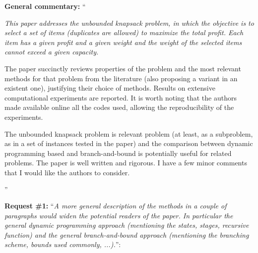 \documentclass{elsarticle}
\begin{document}
\textbf{General commentary:} ``{\itshape
This paper addresses the unbounded knapsack problem, in which the objective is to select a set of items (duplicates are allowed) to maximize the total profit. Each item has a given profit and a given weight and the weight of the selected items cannot exceed a given capacity.

The paper succinctly reviews properties of the problem and the most relevant methods for that problem from the literature (also proposing a variant in an existent one), justifying their choice of methods. Results on extensive computational experiments are reported. It is worth noting that the authors made available online all the codes used, allowing the reproducibility of the experiments.

The unbounded knapsack problem is relevant problem (at least, as a subproblem, as in a set of instances tested in the paper) and the comparison between dynamic programming based and branch-and-bound is potentially useful for related problems. The paper is well written and rigorous. I have a few minor comments that I would like the authors to consider.
}''
\bigskip

\textbf{Request \#1:} ``\textit{A more general description of the methods in a couple of paragraphs would widen the potential readers of the paper. In particular the general dynamic programming approach (mentioning the states, stages, recursive function) and the general branch-and-bound approach (mentioning the branching scheme, bounds used commonly, ...).}'':
\end{document}
